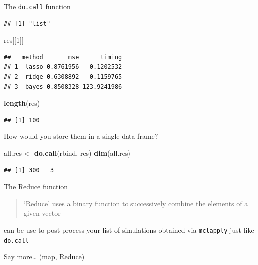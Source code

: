 \documentclass[10pt,ignorenonframetext,]{beamer}
\newenvironment{Shaded}{\begin{snugshade}}{\end{snugshade}}
\newcommand{\KeywordTok}[1]{\textcolor[rgb]{0.13,0.29,0.53}{\textbf{#1}}}
\newcommand{\DecValTok}[1]{\textcolor[rgb]{0.00,0.00,0.81}{#1}}
\newcommand{\StringTok}[1]{\textcolor[rgb]{0.31,0.60,0.02}{#1}}
\newcommand{\NormalTok}[1]{#1}
\begin{document}
\begin{frame}{The \texttt{do.call} function}
\color{gray}

\begin{verbatim}## [1] "list"
\end{verbatim}

\begin{Shaded}
\begin{Highlighting}[]
\NormalTok{res[[}\DecValTok{1}\NormalTok{]]}
\end{Highlighting}
\end{Shaded}

\color{gray}

\begin{verbatim}##   method       mse      timing
## 1  lasso 0.8761956   0.1202532
## 2  ridge 0.6308892   0.1159765
## 3  bayes 0.8508328 123.9241986
\end{verbatim}

\begin{Shaded}
\begin{Highlighting}[]
\KeywordTok{length}\NormalTok{(res)}
\end{Highlighting}
\end{Shaded}

\color{gray}

\begin{verbatim}## [1] 100
\end{verbatim}

\normalsize

How would you store them in a single data frame? \scriptsize

\begin{Shaded}
\begin{Highlighting}[]
\NormalTok{all.res <-}\StringTok{ }\KeywordTok{do.call}\NormalTok{(rbind, res)}
\KeywordTok{dim}\NormalTok{(all.res)}
\end{Highlighting}
\end{Shaded}

\color{gray}

\begin{verbatim}## [1] 300   3
\end{verbatim}

\normalsize

\end{frame}

\begin{frame}[fragile]{The Reduce function}

\begin{quote}
`Reduce' uses a binary function to successively combine the elements of
a given vector
\end{quote}

\rsa can be use to post-process your list of simulations obtained via
\texttt{mclapply} just like \texttt{do.call}

Say more\ldots{} (map, Reduce)

\end{frame}
\end{document}
